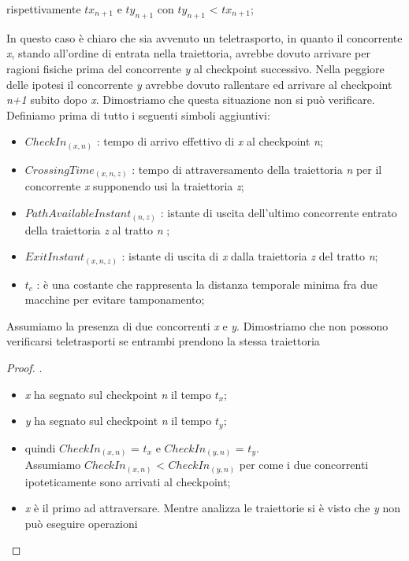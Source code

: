\begin{itemize}
\begin{itemize}
rispettivamente \emph{$tx_{n+1}$} e \emph{$ty_{n+1}$} con \emph{$ty_{n+1}$} < \emph{$tx_{n+1}$};
\end{itemize}
In questo caso è chiaro che sia avvenuto un teletrasporto, in quanto il concorrente \emph{x}, stando all'ordine di entrata nella
traiettoria, avrebbe dovuto arrivare per ragioni fisiche prima del concorrente \emph{y} al checkpoint successivo. Nella peggiore 
delle ipotesi il concorrente \emph{y} avrebbe dovuto rallentare ed arrivare al checkpoint \emph{n+1} subito dopo \emph{x}. 
Dimostriamo che questa situazione non si può verificare. Definiamo prima di tutto i seguenti simboli aggiuntivi:
\begin{itemize}
\item $CheckIn_{(x,n)}$ : tempo di arrivo effettivo di \emph{x} al checkpoint \emph{n};
\item $CrossingTime_{(x,n,z)}$ : tempo di attraversamento della traiettoria \emph{n} per il concorrente \emph{x} supponendo usi la traiettoria
\emph{z}; 
\item $PathAvailableInstant_{(n,z)}$ : istante di uscita dell'ultimo concorrente entrato della traiettoria \emph{z} al tratto \emph{n} ;
\item $ExitInstant_{(x,n,z)}$ : istante di uscita di \emph{x} dalla traiettoria \emph{z} del tratto \emph{n};
\item $t_c$ : è una costante che rappresenta la distanza temporale minima fra due macchine per evitare tamponamento;
\end{itemize}
Assumiamo la presenza di due concorrenti \emph{x} e \emph{y}. Dimostriamo che non possono verificarsi teletrasporti se entrambi
prendono la stessa traiettoria
\begin{proof}.
\begin{itemize}
\item \emph{x} ha segnato sul checkpoint \emph{n} il tempo \emph{$t_x$};
\item \emph{y} ha segnato sul checkpoint \emph{n} il tempo \emph{$t_y$};
\item quindi $CheckIn_{(x,n)}$ = $t_x$ e $CheckIn_{(y,n)}$ = $t_y$. 
\\Assumiamo $CheckIn_{(x,n)}$ < $CheckIn_{(y,n)}$ per come i due concorrenti
ipoteticamente sono arrivati al checkpoint;
\item \emph{x} è il primo ad attraversare. Mentre analizza le traiettorie si è visto che \emph{y} non può eseguire operazioni

\end{itemize}
\end{proof}
\end{itemize}
